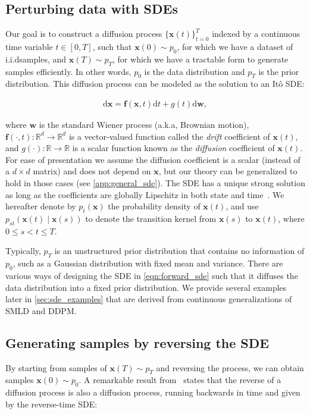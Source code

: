 \subsection{Perturbing data with SDEs}\label{sec:sde_perturb}
Our goal is to construct a diffusion process $\{\mathbf{x}(t)\}_{t=0}^T$ indexed by a continuous time variable $t\in [0,T]$, such that $\mathbf{x}(0) \sim p_{0}$, for which we have a dataset of i.i.d\onedot samples, and $\mathbf{x}(T) \sim p_T$, for which we have a tractable form to generate samples efficiently. In other words, $p_0$ is the data distribution and $p_T$ is the prior distribution. This diffusion process can be modeled as the solution to an It\^{o} SDE:

\begin{align}
    \mathrm{d} \mathbf{x} = \mathbf{f}(\mathbf{x}, t) \mathrm{d} t + {g}(t) \mathrm{d} \mathbf{w}, \label{eqn:forward_sde}
\end{align}

where $\mathbf{w}$ is the standard Wiener process (a.k.a\onedot, Brownian motion), $\mathbf{f}(\cdot, t): \mathbb{R}^d \to \mathbb{R}^d$ is a vector-valued function called the \emph{drift} coefficient of $\mathbf{x}(t)$, and ${g}(\cdot): \mathbb{R} \to \mathbb{R}$ is a scalar function known as the \emph{diffusion} coefficient of $\mathbf{x}(t)$. For ease of presentation we assume the diffusion coefficient is a scalar (instead of a $d \times d$ matrix) and does not depend on $\mathbf{x}$, but our theory can be generalized to hold in those cases (see \ref{app:general_sde}). The SDE has a unique strong solution as long as the coefficients are globally Lipschitz in both state and time~\citep{oksendal2003stochastic}. We hereafter denote by $p_t(\mathbf{x})$ the probability density of $\mathbf{x}(t)$, and use $p_{st}(\mathbf{x}(t) \mid \mathbf{x}(s))$ to denote the transition kernel from $\mathbf{x}(s)$ to $\mathbf{x}(t)$, where $0 \leq s < t \leq T$.

Typically, $p_T$ is an unstructured prior distribution that contains no information of $p_0$, such as a Gaussian distribution with fixed mean and variance. There are various ways of designing the SDE in \ref{eqn:forward_sde} such that it diffuses the data distribution into a fixed prior distribution. We provide several examples later in \ref{sec:sde_examples} that are derived from continuous generalizations of SMLD and DDPM.

\subsection{Generating samples by reversing the SDE}\label{sec:sde_reverse}
By starting from samples of $\mathbf{x}(T) \sim p_T$ and reversing the process, we can obtain samples $\mathbf{x}(0)\sim p_0$. A remarkable result from~\citet{Anderson1982-ny} states that the reverse of a diffusion process is also a diffusion process, running backwards in time and given by the reverse-time SDE:

